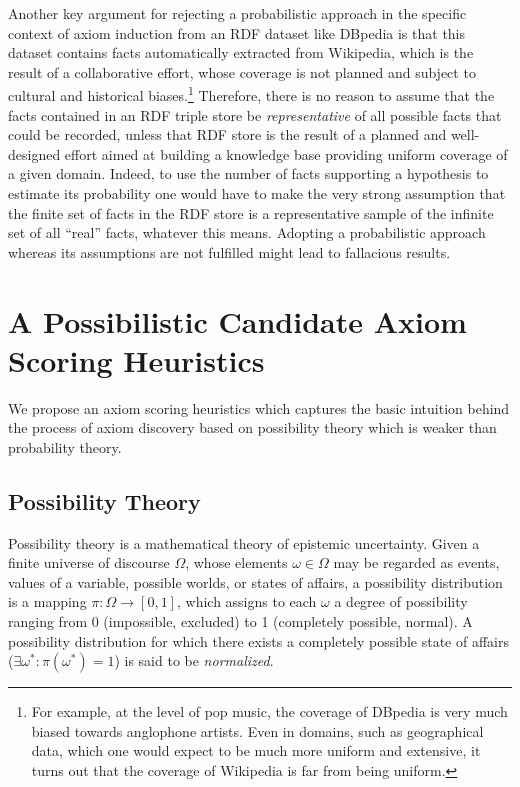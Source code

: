 \documentclass{llncs}
\begin{document}
Another key argument for rejecting a probabilistic approach in the specific context of axiom induction from an RDF dataset like DBpedia is that this dataset contains facts automatically extracted from Wikipedia,
which is the result of a collaborative effort, whose coverage is not planned and
subject to cultural and historical biases.\footnote{For example, at the level
of pop music, the coverage of DBpedia is very much biased towards anglophone artists.
Even in domains, such as geographical data, which one would expect to be much more
uniform and extensive, it turns out that the coverage of Wikipedia is far from being uniform.}
Therefore, there is no reason to assume that the facts contained in an RDF triple store
be \emph{representative} of all possible facts that could be recorded, unless
that RDF store is the result of a planned and well-designed effort aimed at building
a knowledge base providing uniform coverage of a given domain.
Indeed, to use the number of facts supporting a hypothesis
to estimate its probability one would have to make the very strong assumption
that the finite set of facts in the RDF store is a representative sample
of the infinite set of all ``real'' facts, whatever this means.
Adopting a probabilistic approach whereas its assumptions are not
fulfilled might lead to fallacious results.



\section{A Possibilistic Candidate Axiom Scoring Heuristics}
\label{possibility-theory}

We propose an axiom scoring heuristics which captures the basic intuition
behind the process of axiom discovery based on possibility theory which is weaker than probability theory.

\subsection{Possibility Theory}
\label{PossibilityTheory}

Possibility theory \cite{Zadeh1978} is a mathematical theory of epistemic uncertainty.
Given a finite universe of discourse $\Omega$, whose elements $\omega\in\Omega$
may be regarded as events, values of a variable, possible worlds, or states of affairs,
a possibility distribution is a mapping $\pi: \Omega \to [0, 1]$,
which assigns to each $\omega$ a degree of possibility ranging from 0 (impossible,
excluded) to 1 (completely possible, normal).
A possibility distribution for  which there exists a completely possible state of
affairs ($\exists \omega^*: \pi(\omega^*) = 1$) is said to be \emph{normalized}.
\end{document}
